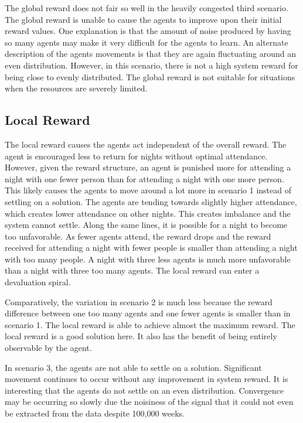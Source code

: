\documentclass[letterpaper, 10 pt, conference]{ieeeconf}
\begin{document}
The global reward does not fair so well in the heavily congested third scenario.  The global reward is unable to cause the agents to improve upon their initial reward values.  One explanation is that the amount of noise produced by having so many agents may make it very difficult for the agents to learn.  An alternate description of the agents movements is that they are again fluctuating around an even distribution.  However, in this scenario, there is not a high system reward for being close to evenly distributed.  The global reward is not suitable for situations when the resources are severely limited.

\subsection{Local Reward}
The local reward causes the agents act independent of the overall reward.  The agent is encouraged less to return for nights without optimal attendance. However, given the reward structure, an agent is punished more for attending a night with one fewer person than for attending a night with one more person.  This likely causes the agents to move around a lot more in scenario 1 instead of settling on a solution.  The agents are tending towards slightly higher attendance, which creates lower attendance on other nights.  This creates imbalance and the system cannot settle.  Along the same lines, it is possible for a night to become too unfavorable.  As fewer agents attend, the reward drops and the reward received for attending a night with fewer people is smaller than attending a night with too many people.  A night with three less agents is much more unfavorable than a night with three too many agents.  The local reward can enter a devaluation spiral.

Comparatively, the variation in scenario 2 is much less because the reward difference between one too many agents and one fewer agents is smaller than in scenario 1.  The local reward is able to achieve almost the maximum reward.  The local reward is a good solution here.  It also has the benefit of being entirely observable by the agent.  

In scenario 3, the agents are not able to settle on a solution.  Significant movement continues to occur without any improvement in system reward.  It is interesting that the agents do not settle on an even distribution.  Convergence may be occurring so slowly due the noisiness of the signal that it could not even be extracted from the data despite 100,000 weeks.
\end{document}
